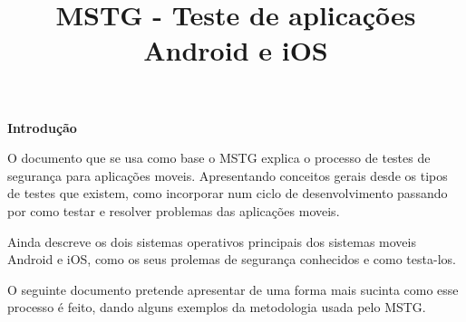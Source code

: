 %
\title{MSTG - Teste de aplicações Android e iOS}
%
%
\author{}
%
%
%
\maketitle              %
%
\begin{abstract}

\end{abstract}
%
%
\begin{center}
\normalsize{\bfseries Introdução}\hfill 

O documento que se usa como base o MSTG explica o processo de testes de segurança para aplicações moveis. Apresentando conceitos gerais desde os tipos de testes que existem, como incorporar num ciclo de desenvolvimento passando por como testar e resolver problemas das aplicações moveis.

Ainda descreve os dois sistemas operativos principais dos sistemas moveis Android e iOS, como os seus prolemas de segurança conhecidos e como testa-los. 

O seguinte documento pretende apresentar de uma forma mais sucinta como esse processo é feito, dando alguns exemplos da metodologia usada pelo MSTG.
\end{center}







